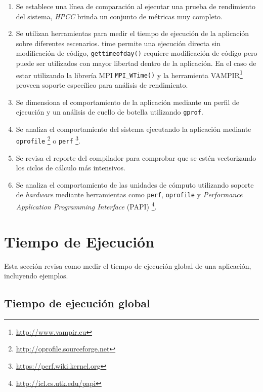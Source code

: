 \documentclass[a4paper]{report}
\begin{document}
\begin{enumerate}

\item Se establece una línea de comparación al ejecutar una prueba de rendimiento del sistema, {\it HPCC} brinda un conjunto de métricas muy completo. 

\item Se utilizan herramientas para medir el tiempo de ejecución de la aplicación sobre diferentes escenarios. time permite una ejecución directa sin modificación de código, {\tt gettimeofday()} requiere modificación de código pero puede ser utilizados con mayor libertad dentro de la aplicación.  
En el caso de estar utilizando la librería MPI {\tt MPI\_WTime()} y la herramienta VAMPIR\footnote{\href{http://www.vampir.eu}{http://www.vampir.eu}} proveen soporte específico para análisis de rendimiento.

\item Se dimensiona el comportamiento de la aplicación mediante un perfil de ejecución y un análisis de cuello de botella utilizando {\tt gprof}. 

\item Se analiza el comportamiento del sistema ejecutando la aplicación mediante {\tt oprofile} \footnote{\href{http://oprofile.sourceforge.net}{http://oprofile.sourceforge.net}} o {\tt perf} \footnote{\href{https://perf.wiki.kernel.org}{https://perf.wiki.kernel.org}}. 

\item Se revisa el reporte del compilador para comprobar que se estén vectorizando los ciclos de cálculo más intensivos.

\item Se analiza el comportamiento de las unidades de cómputo utilizando soporte de {\it hardware} mediante herramientas como {\tt perf}, {\tt oprofile} y {\it Performance Application Programming Interface} (PAPI) \footnote{\href{http://icl.cs.utk.edu/papi}{http://icl.cs.utk.edu/papi}}.

\end{enumerate}

\section{Tiempo de Ejecución}

Esta sección revisa como medir el tiempo de ejecución global de una aplicación, incluyendo ejemplos.

\subsection{Tiempo de ejecución global}
\end{document}
